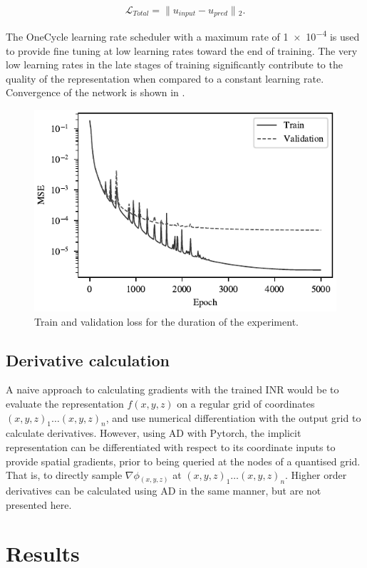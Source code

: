\begin{equation}
    \label{eqn:cri}
    \mathcal{L}_{Total} = \lVert{}u_{input} - u_{pred}\rVert{}_{2}. %
\end{equation}

The OneCycle learning rate scheduler \parencite{smithSuperconvergenceVeryFast2018} with a maximum rate of \num{1e-4} is used to provide fine tuning at low learning rates toward the end of training.
The very low learning rates in the late stages of training significantly contribute to the quality of the representation when compared to a constant learning rate.
Convergence of the network is shown in .


\begin{figure}[hbtp]
    \centering
    \includegraphics[width=0.5\linewidth]{fig/p3/loss_plot.pdf}
    \caption[Training convergence]{Train and validation loss for the duration of the experiment.}
    \label{fig:convergence}
\end{figure}

\subsection{Derivative calculation}
A naive approach to calculating gradients with the trained INR would be to evaluate the representation \(f(x, y, z)\) on a regular grid of coordinates \({(x, y, z)}_1 \dots {(x, y, z)}_n\), and use numerical differentiation with the output grid to calculate derivatives.
However, using AD with Pytorch, the implicit representation can be differentiated with respect to its coordinate inputs to provide spatial gradients, prior to being queried at the nodes of a quantised grid.
That is, to directly sample \(\nabla{}\phi{}_{(x, y, z)}\) at \({(x, y, z)}_1 \dots {(x, y, z)}_n\).
Higher order derivatives can be calculated using AD in the same manner, but are not presented here.

\section{Results}

